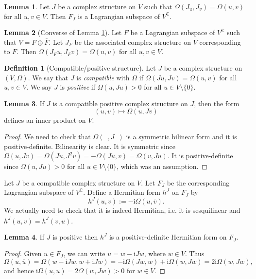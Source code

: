 \documentclass[12pt]{amsart}
\numberwithin{equation}{section}
\theoremstyle{plain}
\theoremstyle{definition}
\newtheorem{defn}{Definition}[subsection]
\newtheorem{lem}{Lemma}[subsection]
\theoremstyle{remark}
\newcommand{\I}{\mathrm{i}}
\begin{document}
\begin{lem}
\label{lem1}
Let $J$ be a complex structure on $V$ such that $\Omega(J_u,J_v)=\Omega(u,v)$ for all $u,v\in V$. Then $F_J$ is a Lagrangian subspace of $V^\mathbb{C}$.
\end{lem}

\begin{lem}[Converse of Lemma \ref{lem1}]
Let $F$ be a Lagrangian subspace of $V^\mathbb{C}$ such that $V=F\oplus \bar F$. Let $J_F$ be the associated complex structure on $V$ corresponding to $F$. Then $\Omega(J_Fu,J_Fv)=\Omega(u,v)$ for all $u,v\in V$.
\end{lem}


\begin{defn}[Compatible/positive structure]
Let $J$ be a complex structure on $(V,\Omega)$. We say that $J$ is \emph{compatible} with $\Omega$ if $\Omega(Ju,Jv)=\Omega(u,v)$ for all $u,v\in V$. We say $J$ is \emph{positive} if $\Omega(u,Ju)>0$ for all $u\in V\setminus\{0\}$.
\end{defn}

\begin{lem}
If $J$ is a compatible positive complex structure on $J$, then the form 
$$(u,v)\mapsto \Omega(u,Jv)$$
defines an inner product on $V$.
\end{lem}

\begin{proof}
We need to check that $\Omega(\enspace,J\enspace)$ is a symmetric bilinear form and it is positive-definite. Bilinearity is clear. It is symmetric since $\Omega(u,Jv)=\Omega(Ju,J^2v)=-\Omega(Ju,v)=\Omega(v,Ju)$. It is positive-definite since $\Omega(u,Ju)>0$ for all $u\in V\setminus\{0\}$, which was an assumption. 
\end{proof}
Let $J$ be a compatible complex structure on $V$. Let $F_J$ be the corresponding Lagrangian subspace of $V^\mathbb{C}$. Define a Hermitian form $h^J$ on $F_J$ by 
$$h^J(u,v):=-\I\Omega(u,\bar v).$$
We actually need to check that it is indeed Hermitian, i.e. it is sesquilinear and $h^J(u,v)=\overline{h^J(v,u)}$.

\begin{lem}
If $J$ is positive then $h^J$ is a positive-definite Hermitian form on $F_J$. 
\end{lem}

\begin{proof}
Given $u\in F_J$, we can write $u=w-\I Jw$, where $w\in V$. Thus
$$\Omega(u,\bar u)=\Omega(w-\I Jw,w+\I Jw)=-\I\Omega(Jw,w)+\I\Omega(w,Jw)=2\I\Omega(w,Jw),$$
and hence $\I\Omega(u,\bar u)=2\Omega(w,Jw)>0$ for $w\in V$.
\end{proof}
\end{document}

